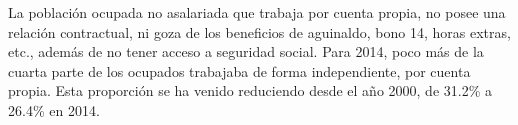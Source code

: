 La población ocupada no asalariada que trabaja por cuenta propia, no posee una relación contractual, ni goza de los beneficios de aguinaldo, bono 14, horas extras, etc., además de no tener acceso a seguridad social. Para 2014, poco más de la cuarta parte de los ocupados trabajaba de forma independiente, por cuenta propia. Esta proporción se ha venido reduciendo desde el año 2000, de  31.2\% a 26.4\% en 2014.